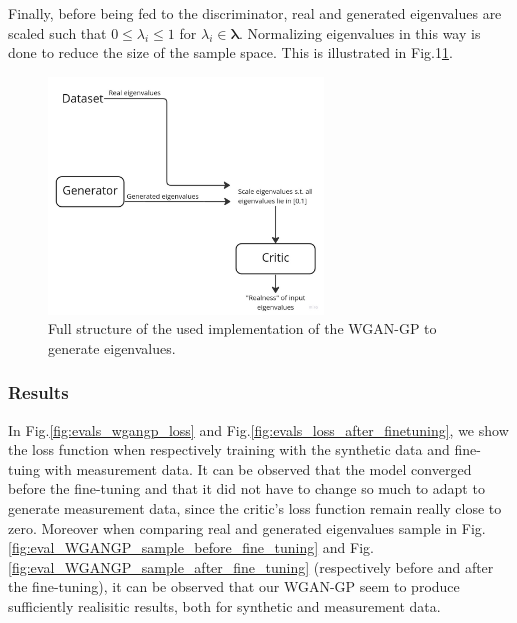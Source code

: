 \documentclass{article}
\begin{document}
Finally, before being fed to the discriminator, real and generated eigenvalues are scaled such that $0 \leq \lambda_i \leq 1$ for $\lambda_i \in \mathbf{\lambda}$. Normalizing eigenvalues in this way is done to reduce the size of the sample space. This is illustrated in Fig.1\ref{fig:evals_wgangp_full_structure}.

\begin{figure}
    \centering
    \includegraphics[width=0.65\textwidth]{../figs/evals_wgangp_full_structure.jpg}
    \caption{Full structure of the used implementation of the WGAN-GP to generate eigenvalues.}
    \label{fig:evals_wgangp_full_structure}
\end{figure}

\subsubsection{Results}

In Fig.\ref{fig:evals_wgangp_loss} and Fig.\ref{fig:evals_loss_after_finetuning}, we show the loss function when respectively training with the synthetic data and fine-tuing with measurement data. It can be observed that the model converged before the fine-tuning and that it did not have to change so much to adapt to generate measurement data, since the critic's loss function remain really close to zero. Moreover when comparing real  and generated eigenvalues sample in Fig.\ref{fig:eval_WGANGP_sample_before_fine_tuning} and Fig.\ref{fig:eval_WGANGP_sample_after_fine_tuning} (respectively before and after the fine-tuning), it can be observed that our WGAN-GP seem to produce sufficiently realisitic results, both for synthetic and measurement data.
\end{document}
